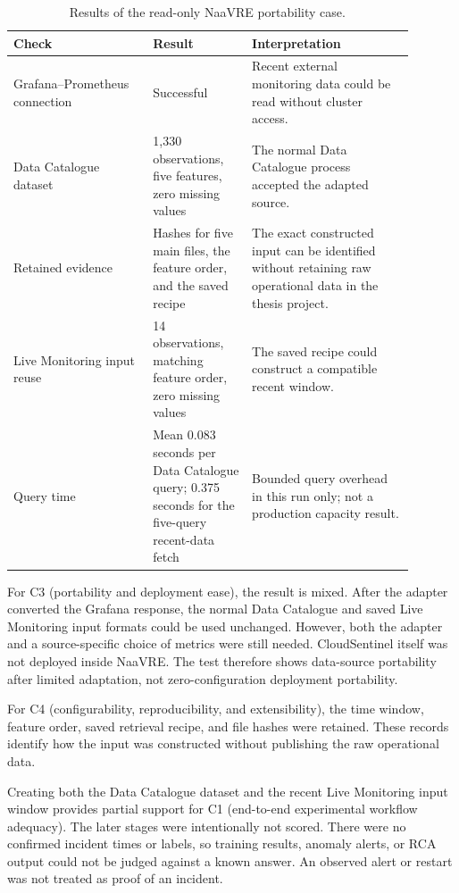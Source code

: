 \begin{table}[H]
    \centering
    \small
    \caption{Results of the read-only NaaVRE portability case.}
    \label{tab:h9-naavre-results}
    \begin{tabular}{|p{0.31\linewidth}|p{0.22\linewidth}|p{0.36\linewidth}|}
        \hline
        Check & Result & Interpretation \\
        \hline
        Grafana--Prometheus connection & Successful & Recent external monitoring data could be read without cluster access. \\
        \hline
        Data Catalogue dataset & 1,330 observations, five features, zero missing values & The normal Data Catalogue process accepted the adapted source. \\
        \hline
        Retained evidence & Hashes for five main files, the feature order, and the saved recipe & The exact constructed input can be identified without retaining raw operational data in the thesis project. \\
        \hline
        Live Monitoring input reuse & 14 observations, matching feature order, zero missing values & The saved recipe could construct a compatible recent window. \\
        \hline
        Query time & Mean 0.083 seconds per Data Catalogue query; 0.375 seconds for the five-query recent-data fetch & Bounded query overhead in this run only; not a production capacity result. \\
        \hline
    \end{tabular}
\end{table}

For C3 (portability and deployment ease), the result is mixed. After the adapter converted the Grafana response, the normal Data Catalogue and saved Live Monitoring input formats could be used unchanged. However, both the adapter and a source-specific choice of metrics were still needed. CloudSentinel itself was not deployed inside NaaVRE. The test therefore shows data-source portability after limited adaptation, not zero-configuration deployment portability.

For C4 (configurability, reproducibility, and extensibility), the time window, feature order, saved retrieval recipe, and file hashes were retained. These records identify how the input was constructed without publishing the raw operational data.

Creating both the Data Catalogue dataset and the recent Live Monitoring input window provides partial support for C1 (end-to-end experimental workflow adequacy). The later stages were intentionally not scored. There were no confirmed incident times or labels, so training results, anomaly alerts, or RCA output could not be judged against a known answer. An observed alert or restart was not treated as proof of an incident.

